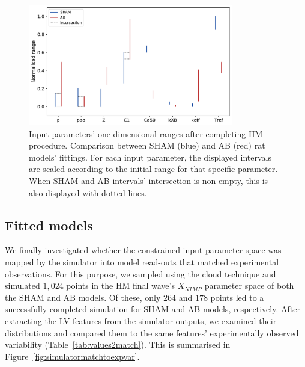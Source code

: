 \begin{figure}[!ht]
    \myfloatalign
    \includegraphics[width=0.8\textwidth]{figures/chapter04/sham_vs_ab_final_ranges.pdf}
    \caption{Input parameters’ one-dimensional ranges after completing HM procedure. Comparison between SHAM (blue) and AB (red) rat models’ fittings. For each input parameter, the displayed intervals are scaled according to the initial range for that specific parameter. When SHAM and AB intervals’ intersection is non-empty, this is also displayed with dotted lines.}
    \label{fig:onedspacered}
\end{figure}


%
%
%
\subsection{Fitted models}\label{sec:ch4fittedmodels}
We finally investigated whether the constrained input parameter space was mapped by the simulator into model read-outs that matched experimental observations. For this purpose, we sampled using the cloud technique and simulated $1,024$ points in the HM final wave's $X_{NIMP}$ parameter space of both the SHAM and AB models. Of these, only $264$ and $178$ points led to a successfully completed simulation for SHAM and AB models, respectively. After extracting the LV features from the simulator outputs, we examined their distributions and compared them to the same features' experimentally observed variability (Table~\ref{tab:values2match}). This is summarised in Figure~\ref{fig:simulatormatchtoexpvar}.

